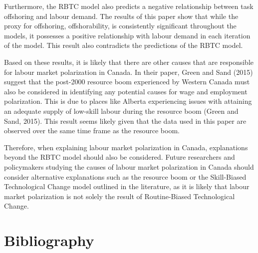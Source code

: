 \documentclass[undefended]{bumrp}
\begin{document}
Furthermore, the RBTC model also predicts a negative relationship between task offshoring and labour demand. The results of this paper show that while the proxy for offshoring, offshorability, is consistently significant throughout the models, it possesses a positive relationship with labour demand in each iteration of the model. This result also contradicts the predictions of the RBTC model.

Based on these results, it is likely that there are other causes that are responsible for labour market polarization in Canada. In their paper, Green and Sand (2015) suggest that the post-2000 resource boom experienced by Western Canada must also be considered in identifying any potential causes for wage and employment polarization. This is due to places like Alberta experiencing issues with attaining an adequate supply of low-skill labour during the resource boom (Green and Sand, 2015). This result seems likely given that the data used in this paper are observed over the same time frame as the resource boom. 

Therefore, when explaining labour market polarization in Canada, explanations beyond the RBTC model should also be considered. Future researchers and policymakers studying the causes of labour market polarization in Canada should consider alternative explanations such as the resource boom or the Skill-Biased Technological Change model outlined in the literature, as it is likely that labour market polarization is not solely the result of Routine-Biased Technological Change.







%
%
%

\backmatter%
	
	

\chapter{Bibliography}
\end{document}
